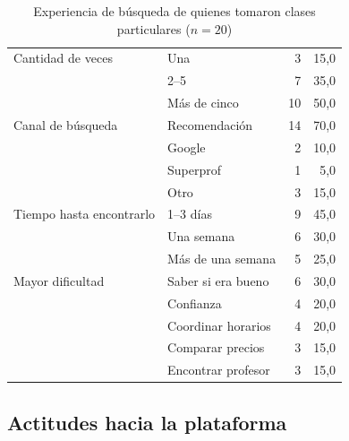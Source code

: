 \begin{table}[H]
    \centering
    \caption{Experiencia de búsqueda de quienes tomaron clases particulares ($n = 20$)}
    \label{tab:encuesta-experiencia}
    \small
    \begin{tabularx}{\textwidth}{l L r r}
        \toprule
         &  &  & \tb{\%} \\
        \midrule
        Cantidad de veces        & Una                & 3  & 15,0 \\
                                 & 2--5               & 7  & 35,0 \\
                                 & Más de cinco       & 10 & 50,0 \\
        \addlinespace
        Canal de búsqueda        & Recomendación      & 14 & 70,0 \\
                                 & Google             & 2  & 10,0 \\
                                 & Superprof          & 1  &  5,0 \\
                                 & Otro               & 3  & 15,0 \\
        \addlinespace
        Tiempo hasta encontrarlo & 1--3 días          & 9  & 45,0 \\
                                 & Una semana         & 6  & 30,0 \\
                                 & Más de una semana  & 5  & 25,0 \\
        \addlinespace
        Mayor dificultad         & Saber si era bueno & 6  & 30,0 \\
                                 & Confianza          & 4  & 20,0 \\
                                 & Coordinar horarios & 4  & 20,0 \\
                                 & Comparar precios   & 3  & 15,0 \\
                                 & Encontrar profesor & 3  & 15,0 \\
        \bottomrule
    \end{tabularx}
\end{table}

\subsection{Actitudes hacia la plataforma}

